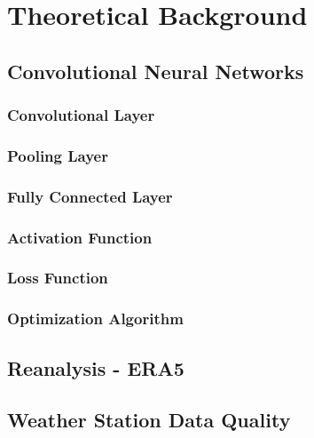 \section{Theoretical Background}
\label{sec:theory}

\subsection{Convolutional Neural Networks}
\label{subsec:cnn}

\subsubsection*{Convolutional Layer}

\subsubsection*{Pooling Layer}

\subsubsection*{Fully Connected Layer}

\subsubsection*{Activation Function}

\subsubsection*{Loss Function}

\subsubsection*{Optimization Algorithm}

\subsection{Reanalysis - ERA5}

\subsection{Weather Station Data Quality}